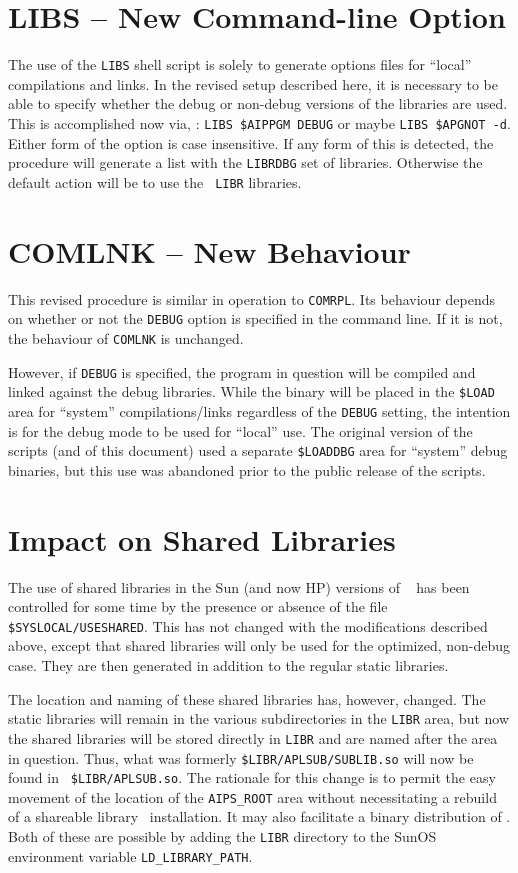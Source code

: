 \section{LIBS -- New Command-line Option}

The use of the {\tt LIBS} shell script is solely to generate options
files for ``local'' compilations and links.  In the revised setup
described here, it is necessary to be able to specify whether the debug
or non-debug versions of the libraries are used.  This is accomplished
now via, \eg: {\tt LIBS \$AIPPGM DEBUG} or maybe {\tt LIBS \$APGNOT -d}.
Either form of the option is case insensitive.  If any form of this is
detected, the procedure will generate a list with the {\tt LIBRDBG} set
of libraries.  Otherwise the default action will be to use the {\tt
LIBR} libraries.

\section{COMLNK -- New Behaviour}

This revised procedure is similar in operation to {\tt COMRPL}.  Its
behaviour depends on whether or not the {\tt DEBUG} option is specified
in the command line.  If it is not, the behaviour of {\tt COMLNK} is
unchanged.

However, if {\tt DEBUG} is specified, the program in question will be
compiled and linked against the debug libraries.  While the binary will
be placed in the {\tt\$LOAD} area for ``system'' compilations/links
regardless of the {\tt DEBUG} setting, the intention is for the debug
mode to be used for ``local'' use.  The original version of the scripts
(and of this document) used a separate {\tt\$LOADDBG} area for
``system'' debug binaries, but this use was abandoned prior to the
public release of the scripts.

\section{Impact on Shared Libraries}

The use of shared libraries in the Sun (and now HP) versions of \AIPS\ %
has been controlled for some time by the presence or absence of the file
{\tt \$SYSLOCAL/USESHARED}.  This has not changed with the modifications
described above, except that shared libraries will only be used for the
optimized, non-debug case.  They are then generated in addition to the
regular static libraries.

The location and naming of these shared libraries has, however, changed.
The static libraries will remain in the various subdirectories in the
{\tt LIBR} area, but now the shared libraries will be stored directly in
{\tt LIBR} and are named after the area in question.  Thus, what was
formerly {\tt\$LIBR/APLSUB/SUBLIB.so} will now be found in {\tt
\$LIBR/APLSUB.so}.  The rationale for this change is to permit the easy
movement of the location of the {\tt AIPS\_ROOT} area without
necessitating a rebuild of a shareable library \AIPS\ installation.  It
may also facilitate a binary distribution of \AIPS.  Both of these are
possible by adding the {\tt LIBR} directory to the SunOS environment
variable {\tt LD\_LIBRARY\_PATH}.

